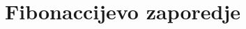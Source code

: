 \documentclass[10pt,a4paper,oneside]{book}
\begin{document}
\section{Fibonaccijevo zaporedje}

\end{document}
